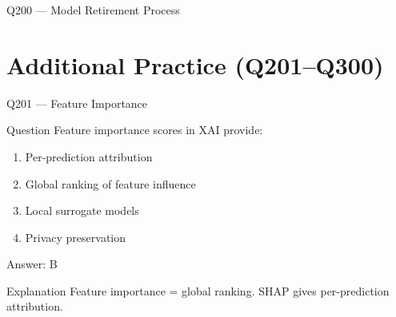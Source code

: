 \documentclass[aspectratio=169,8pt]{beamer}
\begin{document}
\begin{frame}{Q200 --- Model Retirement Process}
\end{frame}

\section{Additional Practice (Q201--Q300)}

\begin{frame}{Q201 --- Feature Importance}
\begin{block}{Question}
Feature importance scores in XAI provide:
\begin{enumerate}
\item Per-prediction attribution
\item Global ranking of feature influence
\item Local surrogate models
\item Privacy preservation
\end{enumerate}
\end{block}
\begin{exampleblock}{Answer: B}\end{exampleblock}
\begin{block}{Explanation}
Feature importance = global ranking. SHAP gives per-prediction attribution.
\end{block}
\end{frame}
\end{document}
